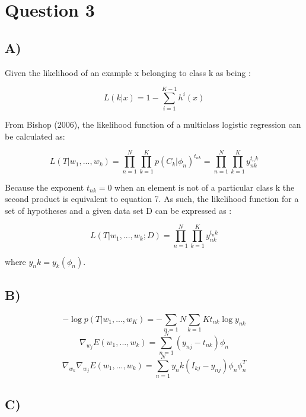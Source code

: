\documentclass{report}
\begin{document}
\section*{Question 3}

\subsection*{A)}
Given the likelihood of an example x belonging to class k as being :

\begin{equation}
  L(k | x) = 1 - \sum_{i=1}^{K-1}h^i(x)
\end{equation}

From Bishop (2006), the likelihood function of a multiclass
logistic regression can be calculated as:

\begin{equation}
  L(T | w_1, ..., w_k)
  = \prod_{n=1}^N \prod_{k=1}^{K}  p(C_k | \phi_n)^{t_{nk}}
  = \prod_{n=1}^N \prod_{k=1}^{K}  y_{nk}^{t_nk}
\end{equation}

Because the exponent $t_{nk} = 0$ when an element
is not of a particular class k the second product is equivalent to equation
7. As such, the likelihood function for a set of hypotheses and a given
data set D can be expressed as :

\begin{equation}
  L(T | w_1, ..., w_k; D)
  = \prod_{n=1}^N \prod_{k=1}^{K}  y_{nk}^{t_nk}
\end{equation}

where $y_nk=y_k(\phi_n)$.

\subsection*{B)}

\begin{equation}
  -\log p(T|w_1,...,w_K)= -\sum_{n=1}{N}\sum_{k=1}{K}t_{nk}\log y_{nk}
\end{equation}
\begin{equation}
  \nabla_{w_j} E( w_1, ..., w_k)
  = \sum_{n=1}^N (y_{nj} - t_{nk}) \phi_n
\end{equation}
\begin{equation}
  \nabla_{w_k} \nabla_{w_j} E( w_1, ..., w_k)
  = \sum_{n=1}^N y_nk(I_{kj} - y_{nj}) \phi_n \phi_n^T
\end{equation}

\subsection*{C)}
\end{document}
